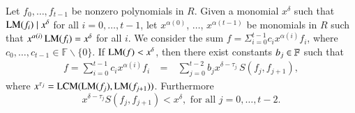 \begin{lemma} \label{lemma:cancel}
Let $f_0,\ldots,f_{t-1}$ be nonzero polynomials in $R$. 
Given a monomial $x^{\delta}$ such that $\textsc{LM}(f_i) \mid x^{\delta}$ for all $i=0,\ldots,t-1$, let $x^{\alpha(0)}$, $\ldots$,  $x^{\alpha(t-1)}$ be monomials in $R$ such that \(x^{\alpha(i)}\,\textsc{LM}(f_{i})=x^{\delta}\) for all \(i\).
We consider the sum \(f = \Sigma^{t-1}_{i=0} c_ix^{\alpha(i)}f_i\), where \(c_{0},\ldots,c_{t-1}\in \mathbb{F}\backslash\{0\}\). If \(\textsc{LM}(f)<x^{\delta}\), then there exist constants $b_{j} \in {\mathbb F}$ such that
\begin{eqnarray} \label{wegheben} 
f=\sum^{t-1}_{i=0} c_ix^{\alpha(i)}f_i\ &=&\ \sum^{t-2}_{j=0}  b_{j}x^{\delta-\tau_{j}}\, S(f_{j},f_{j+1}),
\end{eqnarray}
where \(x^{\tau_{j}} = \textsc{LCM}(\textsc{LM}(f_{j}),\textsc{LM}(f_{j+1}))\). Furthermore
$$
x^{\delta-\tau_{j}}S(f_{j},f_{j+1}) < x^\delta, \mbox{ for all } j=0,\ldots,t-2.
$$
\end{lemma}
